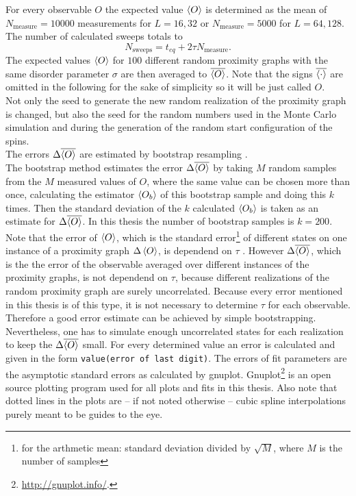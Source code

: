     For every observable \(O\) the expected value \(\left< O \right>\) is determined
    as the mean of \(N_{\mathrm{measure}}=10000\) measurements for \(L=16,32\)
    or \(N_{\mathrm{measure}}=5000\) for \(L=64,128\). The number of
    calculated sweeps totals to
    \[N_{\mathrm{sweeps}}=t_{eq}+2\tau N_{\mathrm{measure}}.\]
    The expected values \(\left< O \right>\) for \(100\) different random proximity
    graphs with the same disorder parameter \(\sigma\) are then averaged to
    \(\overline{\left< O \right>}\). Note that the signs \(\overline{\left< \cdot \right>}\)
    are omitted in the following for the sake of simplicity so
    it will be just called \(O\).\\
    Not only the seed to generate the new random
    realization of the proximity graph is changed, but also the seed for
    the random numbers used in the Monte Carlo simulation and during the
    generation of the random start configuration of the spins.\\
    The errors \(\Delta \overline{\left< O \right>}\) are estimated by bootstrap resampling
    \cite{Bootstrap}.\\
    The bootstrap method estimates the error \(\Delta \overline{\left< O \right>}\)
    by taking \(M\) random samples from the \(M\) measured values of \(O\),
    where the same value can be chosen more than once, calculating the
    estimator \(\left< O_b \right>\) of this bootstrap sample and doing this \(k\)
    times. Then the standard deviation of the \(k\) calculated \(\left< O_b \right>\)
    is taken as an estimate for \(\Delta \overline{\left< O \right>}\).
    In this thesis the number of bootstrap samples is \(k = 200\).\\
    Note that the error of \(\left< O \right>\), which is the standard error\footnote{for the arthmetic mean: standard deviation divided by \(\sqrt M\), where \(M\) is the number of samples}
    of different states on one instance of a proximity graph \(\Delta \left< O \right>\),
    is dependend on \(\tau\) \cite[p. 151]{Katzgraber2011}.
    However \(\Delta \overline{\left< O \right>}\), which is the the error of the
    observable averaged over different instances of the proximity graphs,
    is not dependend on \(\tau\), because different realizations of the
    random proximity graph are surely uncorrelated.
    Because every error mentioned in this thesis is of this type, it is not
    necessary to determine \(\tau\) for each observable. Therefore a good
    error estimate can be achieved by simple bootstrapping. Nevertheless, one has
    to simulate enough uncorrelated states for each realization to keep
    the \(\Delta \overline{\left< O \right>}\) small. For every determined value an
    error is calculated and given in the form \texttt{value(error of last digit)}.
    The errors of fit parameters are the asymptotic standard errors as calculated
    by gnuplot. Gnuplot\footnote{\url{http://gnuplot.info/}.} is an open
    source plotting program used for all plots and fits in this thesis.
    Also note that dotted lines in the plots are -- if not noted otherwise --
    cubic spline interpolations purely meant to be guides to the eye.

